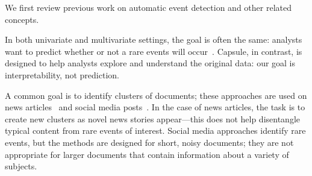 

  We first review previous work on automatic event detection and other related concepts.  

In both univariate and multivariate settings, the goal is often the same: analysts want to predict whether or not a rare events will occur~\cite{weiss1998learning,das2008anomaly}.  Capsule, in contrast, is designed to help analysts explore and understand the original data: our goal is interpretability, not prediction.

\newpage %
A common goal is to identify clusters of documents; these approaches are used on news articles~\cite{zhao2012novel,zhao2007temporal,zhang2002novelty,li2005probabilistic,wang2007mining,allan1998line} and social media posts~\cite{VanDam:2012,lau2012line,jackoway2011identification,sakaki2010earthquake,reuter2012event,becker2010learning,sayyadi2009event}.  
In the case of news articles, the task is to create new clusters as novel news stories appear---this does not help disentangle typical content from rare events of interest.
Social media approaches identify rare events, but the methods are designed for short, noisy documents; they are not appropriate for larger documents that contain information about a variety of subjects.


